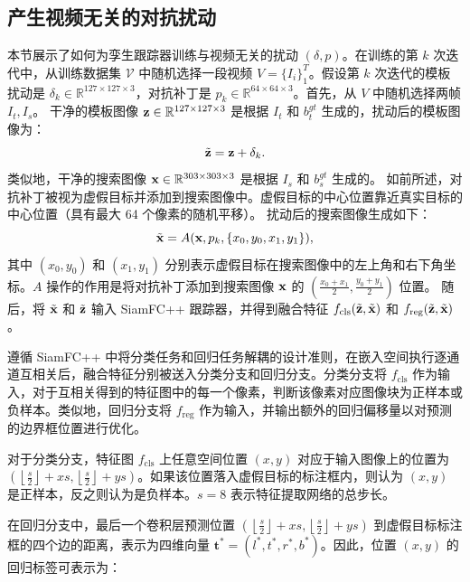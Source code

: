 \subsection{产生视频无关的对抗扰动}
本节展示了如何为孪生跟踪器训练与视频无关的扰动 $(\delta, p)$。在训练的第 $k$ 次迭代中，从训练数据集 $\mathcal V$ 中随机选择一段视频 $V=\{I_i\}_1^T$。假设第 $k$ 次迭代的模板扰动是 $\delta_k \in \mathbb{R}^{127\times 127 \times 3}$，对抗补丁是 $p_k \in \mathbb{R}^{64\times 64\times 3}$。首先，从 $V$ 中随机选择两帧 $I_t, I_s$。
干净的模板图像 $\textbf z\in \mathbb{R}^{127\times 127 \times 3}$ 是根据 $I_t$ 和 $b^{gt}_t$ 生成的，扰动后的模板图像为：
\begin{equation}
\tilde {\textbf z} = \textbf z + \delta_k.
\end{equation}
类似地，干净的搜索图像 $\textbf x \in \mathbb{R}^{303\times 303 \times 3}$ 是根据 $I_s$ 和 $b^{gt}_s$ 生成的。
如前所述，对抗补丁被视为虚假目标并添加到搜索图像中。虚假目标的中心位置靠近真实目标的中心位置（具有最大 64 个像素的随机平移）。
扰动后的搜索图像生成如下：
\begin{equation}
\tilde{\textbf x} = A(\textbf x, p_k, \{x_0, y_0, x_1, y_1\}),
\end{equation}
其中 $(x_0, y_0)$ 和 $(x_1, y_1)$ 分别表示虚假目标在搜索图像中的左上角和右下角坐标。$A$ 操作的作用是将对抗补丁添加到搜索图像 $\textbf x$ 的 $(\frac{x_0+x_1}{2},\frac{y_0+y_1}{2})$ 位置。
随后，将 $\tilde {\textbf x}$ 和 $\tilde{\textbf z}$ 输入 SiamFC++ 跟踪器，并得到融合特征 $f_{\mathrm{cls}}(\tilde{\textbf z}, \tilde {\textbf x})$ 和 $f_{\mathrm{reg}}(\tilde{\textbf z}, \tilde {\textbf x})$。

遵循 SiamFC++ \cite{SiamFC++} 中将分类任务和回归任务解耦的设计准则，在嵌入空间执行逐通道互相关后，融合特征分别被送入分类分支和回归分支。分类分支将 $f_{\mathrm{cls}}$ 作为输入，对于互相关得到的特征图中的每一个像素，判断该像素对应图像块为正样本或负样本。类似地，回归分支将 $f_{\mathrm{reg}}$ 作为输入，并输出额外的回归偏移量以对预测的边界框位置进行优化。

对于分类分支，特征图 $f_{\mathrm{cls}}$ 上任意空间位置 $(x,y)$ 对应于输入图像上的位置为 $\left(\left\lfloor\frac{s}{2}\right\rfloor+x s,\left\lfloor\frac{s}{2}\right\rfloor+y s\right)$。如果该位置落入虚假目标的标注框内，则认为 $(x,y)$ 是正样本，反之则认为是负样本。$s=8$ 表示特征提取网络的总步长。

在回归分支中，最后一个卷积层预测位置 $\left(\left\lfloor\frac{s}{2}\right\rfloor+x s,\left\lfloor\frac{s}{2}\right\rfloor+y s\right)$ 到虚假目标标注框的四个边的距离，表示为四维向量 $\boldsymbol{t}^{*}=\left(l^{*}, t^{*}, r^{*}, b^{*}\right)$。因此，位置 $(x,y)$ 的回归标签可表示为：

